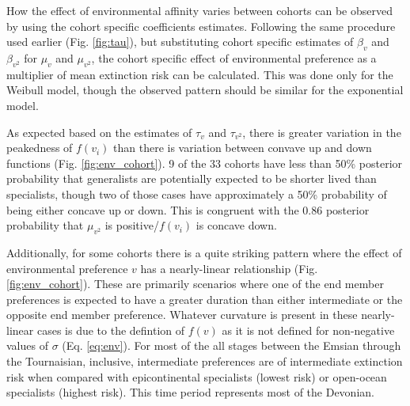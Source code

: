 \documentclass[12pt,letterpaper]{article}
\begin{document}
How the effect of environmental affinity varies between cohorts can be observed by using the cohort specific coefficients estimates. Following the same procedure used earlier (Fig. \ref{fig:tau}), but substituting cohort specific estimates of \(\beta_{v}\) and \(\beta_{v^{2}}\) for \(\mu_{v}\) and \(\mu_{v^{2}}\), the cohort specific effect of environmental preference as a multiplier of mean extinction risk can be calculated. This was done only for the Weibull model, though the observed pattern should be similar for the exponential model. 

As expected based on the estimates of \(\tau_{v}\) and \(\tau_{v^{2}}\), there is greater variation in the peakedness of \(f(v_{i})\) than there is variation between convave up and down functions (Fig. \ref{fig:env_cohort}). 9 of the 33 cohorts have less than 50\% posterior probability that generalists are potentially expected to be shorter lived than specialists, though two of those cases have approximately a 50\% probability of being either concave up or down. This is congruent with the 0.86 posterior probability that \(\mu_{v^{2}}\) is positive/\(f(v_{i})\) is concave down.


Additionally, for some cohorts there is a quite striking pattern where the effect of environmental preference \(v\) has a nearly-linear relationship (Fig. \ref{fig:env_cohort}). These are primarily scenarios where one of the end member preferences is expected to have a greater duration than either intermediate or the opposite end member preference. Whatever curvature is present in these nearly-linear cases is due to the defintion of \(f(v)\) as it is not defined for non-negative values of \(\sigma\) (Eq. \ref{eq:env}). For most of the all stages between the Emsian through the Tournaisian, inclusive, intermediate preferences are of intermediate extinction risk when compared with epicontinental specialists (lowest risk) or open-ocean specialists (highest risk). This time period represents most of the Devonian.
\end{document}
